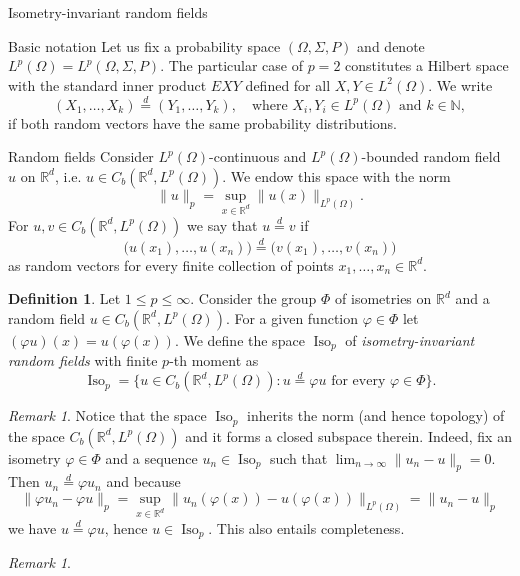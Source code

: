 \documentclass[a4paper,10pt,fleqn]{amsart}
\theoremstyle{remark}
\newtheorem{remark}[theorem]{Remark}
\theoremstyle{definition}
\newtheorem{definition}[theorem]{Definition}
\DeclareMathOperator{\Iso}{Iso}
\newcommand{\X} {{\mathbb{R}^d}}
\newcommand{\N} {\mathbb{N}}
\renewcommand{\phi} {\varphi}
\renewcommand{\=} {\overset{d}{=}}
\newcommand{\Lp} {{L^p(\Omega)}}
\newcommand{\Ld} {{L^2(\Omega)}}
\begin{document}
\begin{section}{Isometry-invariant random fields}
\begin{subsection}{Basic notation}
      Let us fix a probability space $(\Omega,\Sigma,P)$ and denote $\Lp = L^p(\Omega,\Sigma,P)$.
      The particular case of $p=2$ constitutes a
      Hilbert space with the standard inner product $EXY$ defined for all $X,Y\in \Ld$.
      We write
      \begin{equation*}
        (X_1,\ldots,X_k) \= (Y_1,\ldots,Y_k),\quad\text{where $X_i,Y_i\in \Lp$ and $k\in\N$},
      \end{equation*}
      if both random vectors have the same probability distributions.
    \end{subsection}
\begin{subsection}{Random fields}
  Consider $\Lp$-continuous and $\Lp$-bounded random field $u$ on $\X$, i.e. $u\in C_b(\X,\Lp)$.
  We endow this space with the norm
  \begin{equation*}
    \|u\|_p = \sup_{x\in\X}\|u(x)\|_{\Lp}.
  \end{equation*}
  For $u,v\in C_b(\X,\Lp)$ we say that $u\=v$ if
  \begin{equation*}
    \big(u(x_1),\ldots,u(x_n)\big) \= \big(v(x_1),\ldots,v(x_n)\big)
  \end{equation*}
  as random vectors for every finite collection of points $x_1,\ldots,x_n\in \X$.
  \begin{definition}
  Let $1\leq p \leq \infty$. Consider the group $\Phi$ of isometries on $\X$ and a random field $u\in C_b(\X,\Lp)$.
  For a given function $\phi\in\Phi$ let $(\phi u)(x) =  u(\phi(x))$.
  We define the space $\Iso_p$ of \emph{isometry-invariant random fields} with finite $p$-th moment as
  \begin{equation*}
      \Iso_p = \{u\in C_b(\X,\Lp): u \= \phi u \text{ for every $\phi\in\Phi$}\}.
  \end{equation*}
  \end{definition}
  \begin{remark}
  Notice that the space $\Iso_p$ inherits the norm (and hence topology) of the space $C_b(\X,\Lp)$
  and it forms a closed subspace therein. Indeed, fix an isometry $\phi\in\Phi$ and a sequence $u_n\in\Iso_p$
  such that $\lim_{n\to\infty}\|u_n-u\|_p = 0$.
  Then $u_n\=\phi u_n$ and because
  \begin{equation*}
   \|\phi u_n-\phi u\|_p= \sup_{x\in\X}\|u_n(\phi(x))-u(\phi(x))\|_\Lp= \|u_n-u\|_p
  \end{equation*}
we have $u \= \phi u$, hence $u\in\Iso_p$.
  This also entails completeness.
  \end{remark}
  \begin{remark}\label{independent}

\end{remark}
\end{subsection}
\end{section}
\end{document}
